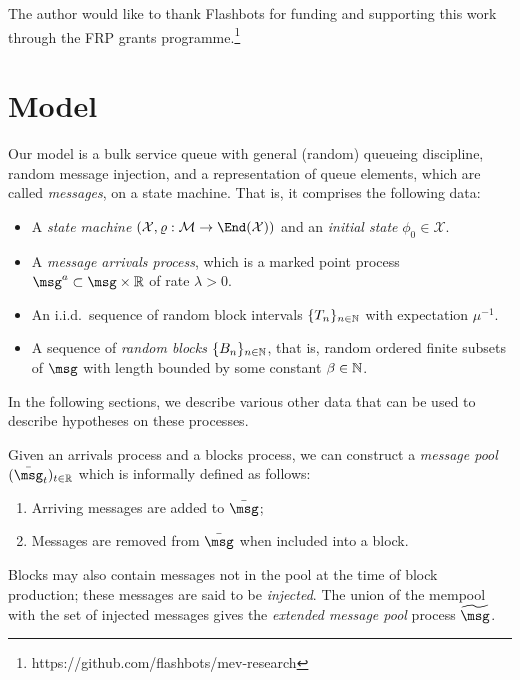 \documentclass[a4paper,11pt]{article}
\begin{document}
The author would like to thank Flashbots for funding and supporting this work through the FRP grants programme.\footnote{https://github.com/flashbots/mev-research}

\section{Model}

Our model is a bulk service queue with general (random) queueing discipline, random message injection, and a representation of queue elements, which are called \emph{messages}, on a state machine. That is, it comprises the following data:
%
\begin{itemize}

  \item
    A \emph{state machine} $(\mathcal{X},\varrho:\mathcal{M}\rightarrow\End(\mathcal{X}))$ and an \emph{initial state} $\phi_0\in\mathcal{X}$.
    
  \item
    A \emph{message arrivals process}, which is a marked point process $\msg^a\subset\msg\times\R$ of rate $\lambda>0$.
    
  \item
    An i.i.d.~sequence of random block intervals $\{T_n\}_{n\in\mathbb N}$ with expectation $\mu^{-1}$.
    
  \item
    A sequence of \emph{random blocks} $\{B_n\}_{n\in\mathbb N}$, that is, random ordered finite subsets of $\msg$ with length bounded by some constant $\beta\in\mathbb N$.
    
\end{itemize}
%
In the following sections, we describe various  other data that can be used to describe hypotheses on these processes.

Given an arrivals process and a blocks process, we can construct a \emph{message pool} $(\bar\msg_t)_{t\in\R}$ which is informally defined as follows:
\begin{enumerate}
\item Arriving messages are added to $\bar{\msg}$;
\item Messages are removed from $\bar\msg$ when included into a block.
\end{enumerate}
Blocks may also contain messages not in the pool at the time of block production; these messages are said to be \emph{injected}.
%
The union of the mempool with the set of injected messages gives the \emph{extended message pool} process $\widetilde\msg$.
\end{document}
